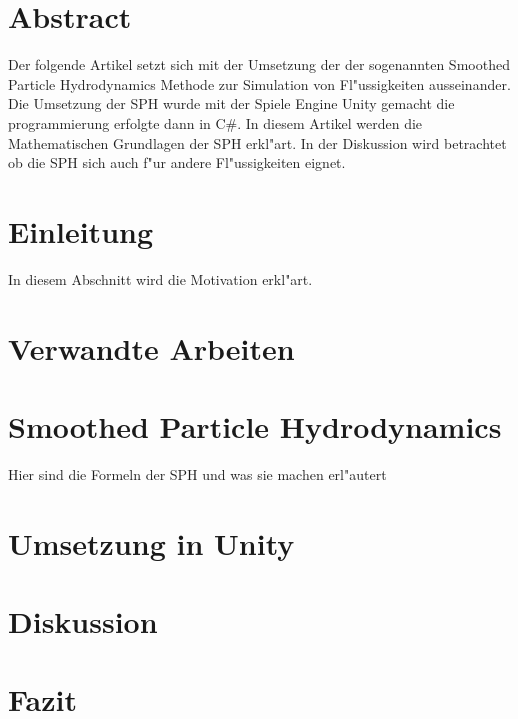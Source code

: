 

\section*{Abstract} %
\label{cha:abtract}

Der folgende Artikel setzt sich mit der Umsetzung der %
der sogenannten Smoothed Particle Hydrodynamics Methode %
zur Simulation von Fl"ussigkeiten ausseinander. %
Die Umsetzung der SPH wurde mit der Spiele Engine Unity %
gemacht die programmierung erfolgte dann in C\#. %
In diesem Artikel werden die Mathematischen Grundlagen %
der SPH erkl"art. In der Diskussion wird betrachtet ob %
die SPH sich auch f"ur andere Fl"ussigkeiten eignet.

\section{Einleitung}
\label{sec:einleitung}

In diesem Abschnitt wird die Motivation erkl"art. %

\section{Verwandte Arbeiten}
\label{sec:arbeiten}


\section{Smoothed Particle Hydrodynamics}
\label{sec:sph}
Hier sind die Formeln der SPH und was sie machen erl"autert %

\section{Umsetzung in Unity}
\label{sec:umsetzung}

\section{Diskussion}
\label{sec:diskussion}

\section{Fazit}
\label{sec:fazit}
